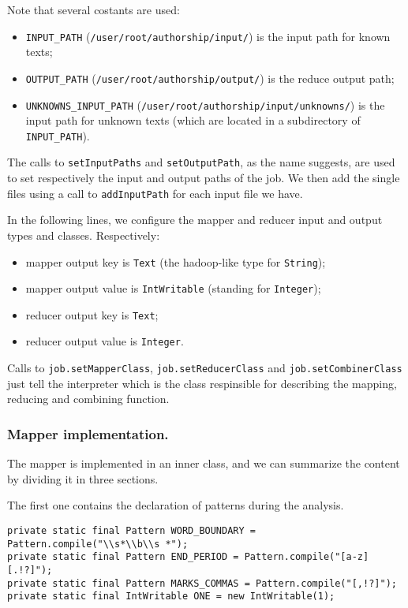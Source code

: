 \documentclass[a4paper,11pt, twoside]{article}
\begin{document}
	Note that several costants are used: \begin{itemize}
		\item \lstinline|INPUT_PATH| (\lstinline|/user/root/authorship/input/|) is the input path for known texts;
		\item \lstinline|OUTPUT_PATH| (\lstinline|/user/root/authorship/output/|) is the reduce output path;
		\item \lstinline|UNKNOWNS_INPUT_PATH| (\lstinline|/user/root/authorship/input/unknowns/|) is the input path for unknown texts (which are located in a subdirectory of \lstinline|INPUT_PATH|).
	\end{itemize}

	The calls to \lstinline|setInputPaths| and \lstinline|setOutputPath|, as the name suggests, are used to set respectively the input and output paths of the job. We then add the single files using a call to \lstinline|addInputPath| for each input file we have. 
	
	\bigskip
	\noindent
	In the following lines, we configure the mapper and reducer input and output types and classes.
	Respectively: \begin{itemize}
		\item mapper output key is \lstinline|Text| (the hadoop-like type for \lstinline|String|);
		\item mapper output value is \lstinline|IntWritable| (standing for \lstinline|Integer|);
		\item reducer output key is \lstinline|Text|;
		\item reducer output value is \lstinline|Integer|.
	\end{itemize}

	Calls to \lstinline|job.setMapperClass|, \lstinline|job.setReducerClass| and \lstinline|job.setCombinerClass| just tell the interpreter which is the class respinsible for describing the mapping, reducing and combining function.
	
	\subsubsection{Mapper implementation.} The mapper is implemented in an inner class, and we can summarize the content by dividing it in three sections.
	
	The first one contains the declaration of patterns during the analysis.
	
	\begin{lstlisting}[firstnumber=73, caption={Declaration of Regular Expression Patterns}, captionpos=b]
private static final Pattern WORD_BOUNDARY = Pattern.compile("\\s*\\b\\s *");
private static final Pattern END_PERIOD = Pattern.compile("[a-z][.!?]");
private static final Pattern MARKS_COMMAS = Pattern.compile("[,!?]");
private static final IntWritable ONE = new IntWritable(1);
	\end{lstlisting}
	
\end{document}
